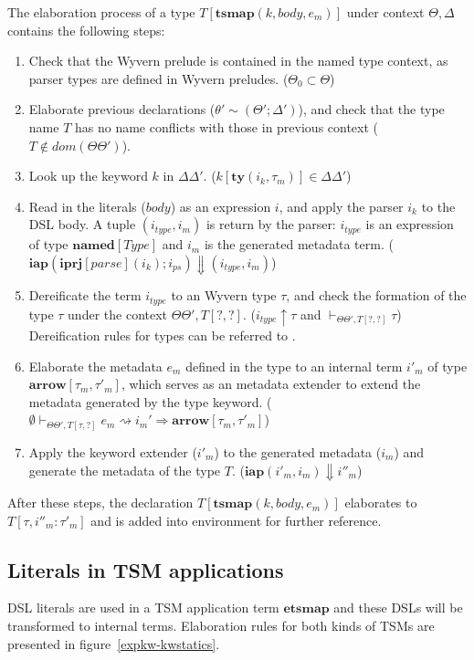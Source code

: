 \documentclass{sig-alternate}
\begin{document}
The elaboration process of a type $T[\mathbf{tsmap}(k,body,e_m)]$ under context $\Theta,\Delta$ contains the following steps:
\begin{enumerate}\setlength{\itemsep}{0pt}
\item Check that the Wyvern prelude is contained in the named type context, as parser types are defined in Wyvern preludes. ($\Theta_0\subset \Theta$)
\item Elaborate previous declarations ($\theta'\sim(\Theta';\Delta')$), and check that the type name $T$ has no name conflicts with those in previous context ($T\notin dom(\Theta\Theta')$).
\item Look up the keyword $k$ in $\Delta\Delta'$. ($k[\mathbf{ty}(i_k,\tau_m)]\in\Delta\Delta'$)
\item Read in the literals ($body$) as an expression $i$, and apply the parser $i_k$ to the DSL body. A tuple $(i_{type}, i_m)$ is return by the parser: $i_{type}$ is an expression of type $\mathbf{named}[Type]$ and $i_m$ is the generated metadata term. ($\mathbf{iap}(\mathbf{iprj}[parse](i_k);i_{ps})\Downarrow(i_{type},i_{m})$)
\item Dereificate the term $i_{type}$ to an Wyvern type $\tau$, and check the formation of the type $\tau$ under the context $\Theta\Theta',T[?,?]$. ($i_{type}\uparrow\tau$ and $\vdash_{\Theta\Theta',T[?,?]}\tau$) Dereification rules for types can be referred to .
\item Elaborate the metadata $e_m$ defined in the type to an internal term $i'_m$ of type $\mathbf{arrow}[\tau_m,\tau'_m]$, which serves as an metadata extender to extend the metadata generated by the type keyword. ($\emptyset\vdash_{\Theta\Theta',T[\tau,?]}e_m\rightsquigarrow i_m' \Rightarrow \mathbf{arrow}[\tau_m, \tau'_m]$)
\item Apply the keyword extender ($i'_m$) to the generated metadata ($i_m$) and generate the metadata of the type $T$. ($\mathbf{iap}(i'_m,i_m)\Downarrow i''_m$)  
\end{enumerate}
After these steps, the declaration $T[\mathbf{tsmap}(k,body,e_m)]$ elaborates to $T[\tau,i''_m:\tau'_m]$ and is added into environment for further reference.



\subsection{Literals in TSM applications}
DSL literals are used in a TSM application term $\mathbf{etsmap}$ and these DSLs will be transformed to internal terms. Elaboration rules for both kinds of TSMs are presented in figure~\ref{expkw-kwstatics}.
\end{document}

